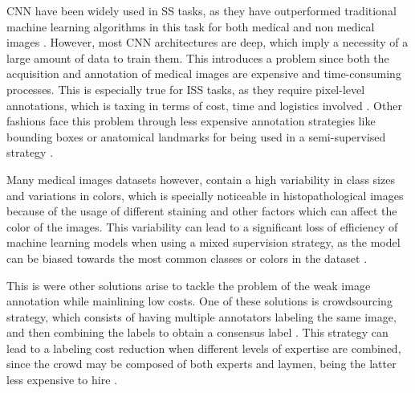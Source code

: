 \gls{CNN} have been widely used in \gls{SS} tasks, as they have outperformed
traditional machine learning algorithms in this task for both medical
and non medical images \cite{XuYan2024} \cite{Sarvamangala2022}.
However, most \gls{CNN} architectures are deep, which imply
a necessity of a large amount of data to train them. This introduces
a problem since both the acquisition and annotation of medical images
are expensive and time-consuming processes. This is especially true
for \gls{ISS} tasks, as they require pixel-level annotations, which
is taxing in terms of cost, time and logistics involved
\cite{Bhalgat2018}. Other fashions face this problem through less expensive
annotation strategies like bounding boxes or anatomical landmarks for
being used in a semi-supervised strategy \cite{Shah2018}.


Many medical images datasets however, contain a high variability in
class sizes and variations in colors, which is specially noticeable
in histopathological images because of the usage of different
staining and other factors which can affect the color of the images.
This variability can lead to a significant loss of efficiency of
machine learning models when using a mixed supervision strategy, as
the model can be biased towards the most common classes or colors in
the dataset \cite{Shah2018}.

This is were other solutions arise to tackle the problem of the weak
image annotation while mainlining low costs. One of these solutions
is crowdsourcing strategy, which consists of having multiple annotators
labeling the same image, and then combining the labels to obtain a
consensus label \cite{LuEtAl2023}. This strategy can lead to a
labeling cost reduction when different levels of expertise are
combined, since the crowd may be composed of both experts and laymen,
being the latter less expensive to hire \cite{Lopez2023}.


